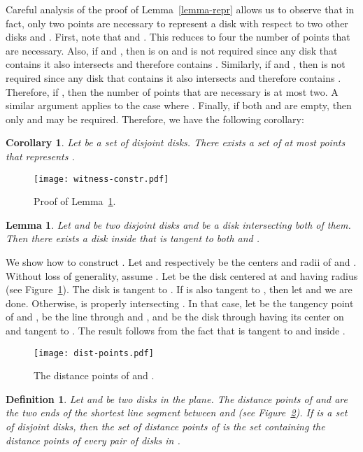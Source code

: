 \documentclass[pdftex,leqno,fleqn,12pt]{article}
\newtheorem{corollary}[theorem]{Corollary}
\newtheorem{lemma}[theorem]{Lemma}
\newtheorem{definition}[theorem]{Definition}
\newenvironment{proof}{{\textit Proof:} \rm}{\hfill  \medskip\\}
\begin{document}
Careful analysis of the proof of Lemma~\ref{lemma-repr} allows us to observe that in fact, only two
points are necessary to represent a disk  with respect to two other disks  and . First,
note that  and .
This reduces to four the number of points that are necessary. Also, if  and
, then  is on  and is not required since any disk that contains it
also intersects  and therefore contains . Similarly, if  and
, then  is not required since any disk that contains it also intersects
 and therefore contains . Therefore, if , then the number of points
that are necessary is at most two. A similar argument applies to the case where .
Finally, if both  and  are empty, then only  and  may be required. Therefore,
we have the following corollary:

\begin{corollary}\label{cor-finite-rep} Let  be a set of  disjoint disks.
There exists a set of at most  points that represents .
\end{corollary}

\begin{figure}
\centering
\texttt{[image: witness-constr.pdf]}\caption{Proof of Lemma~\ref{lemma-witness-constr}.}\label{fig-witness-constr}
\end{figure}

\begin{lemma}\label{lemma-witness-constr} Let  and  be two disjoint disks and  be a
disk intersecting both of them. Then there exists a disk  inside  that is tangent to both 
and .
\end{lemma}
\begin{proof} We show how to construct . Let  and  respectively be the
centers and radii of  and . Without loss of generality, assume . Let
 be the disk centered at  and having radius  (see
Figure~\ref{fig-witness-constr}). The disk  is tangent to . If  is also tangent to ,
then let  and we are done. Otherwise,  is properly intersecting . In that case, let 
be the tangency point of  and ,  be the line through  and , and  be the disk
through  having its center on  and tangent to . The result follows from the fact that 
is tangent to  and inside .
\end{proof}


\begin{figure}
\centering
\texttt{[image: dist-points.pdf]}\caption{The distance points of  and
.}\label{fig-dist-points}
\end{figure}

\begin{definition} Let  and  be two disks in the plane. The
\emph{distance points} of  and  are the two ends of the shortest line segment between  and
 (see Figure~\ref{fig-dist-points}). If  is a set of disjoint disks, then the set
of \emph{distance points} of  is the set containing the distance points of every pair
of disks in .
\end{definition}
\end{document}
